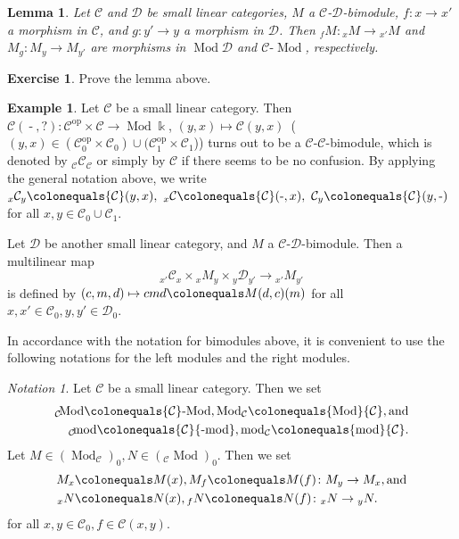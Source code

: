 \documentclass{surv-l}
\numberwithin{equation}{chapter}
\numberwithin{figure}{chapter}
\theoremstyle{plain}
\newtheorem{lem}[thm]{Lemma}
\theoremstyle{definition}
\newtheorem{exm}[thm]{Example}
\newtheorem{exc}[thm]{Exercise}
\theoremstyle{remark}
\newtheorem{ntn}[thm]{Notation}
\newcommand{\lMod}{\text{-}\!\Mod}
\newcommand{\lmod}{\text{-}\!\operatorname{mod}}
\newcommand{\llow}[1]{{}_{#1}\!}
\DeclareMathOperator{\Mod}{Mod}
\DeclareMathOperator{\blank}{-}
\begin{document}
\begin{lem}\label{lem:bimod-onesided}
Let ${\mathcal{C}}$ and ${\mathcal{D}}$ be small linear categories, $M$ a ${\mathcal{C}}$-${\mathcal{D}}$-bimodule,
$f \colon x \to x'$ a  morphism in ${\mathcal{C}}$, and $g \colon y' \to y$ a morphism
in ${\mathcal{D}}$.
Then ${}_fM \colon {}_xM \to {}_{x'}M$ and $M_g \colon M_y \to M_{y'}$
are morphisms in $\Mod{\mathcal{D}}$ and ${\mathcal{C}}\lMod$, respectively.
\end{lem}

\begin{exc}
Prove the lemma above.
\end{exc}

\begin{exm}
Let ${\mathcal{C}}$ be a small linear category.
Then ${\mathcal{C}}(\blank, ?) \colon {\mathcal{C}}^{\mathrm{op}} \times {\mathcal{C}} \to \Mod\Bbbk$,
$(y, x) \mapsto {\mathcal{C}}(y, x)$\ ($(y, x) \in ({\mathcal{C}}^{\mathrm{op}}_0 \times {\mathcal{C}}_0) \cup ({\mathcal{C}}^{\mathrm{op}}_1 \times {\mathcal{C}}_1$))
turns out to be a ${\mathcal{C}}$-${\mathcal{C}}$-bimodule,
which is denoted by ${}_{\mathcal{C}}{\mathcal{C}}_{\mathcal{C}}$ or simply by ${\mathcal{C}}$
if there seems to be no confusion.
By applying the general notation above,
we write
${}_x{\mathcal{C}}_y\colonequals  {\mathcal{C}}(y, x),\  {}_x{\mathcal{C}}\colonequals  {\mathcal{C}}(\text{-}, x),\  {\mathcal{C}}_y\colonequals  {\mathcal{C}}(y, \text{-})$
for all $x, y \in {\mathcal{C}}_0 \cup {\mathcal{C}}_1$.

Let ${\mathcal{D}}$ be another small linear category, and $M$ a ${\mathcal{C}}$-${\mathcal{D}}$-bimodule.
Then a multilinear map
\[
{}_{x'}{\mathcal{C}}_x \times {}_xM_y \times {}_y{\mathcal{D}}_{y'} \to {}_{x'}M_{y'}
\]
is defined by $(c, m, d) \mapsto cmd\colonequals  M(d, c)(m)$
for all $x,x' \in {\mathcal{C}}_0, y, y' \in {\mathcal{D}}_0$.
\end{exm}

In accordance with the notation for bimodules above,
it is convenient to use the following notations for the left modules and the right modules.

\begin{ntn}
Let ${\mathcal{C}}$ be a small linear category.
Then we set
\[
\begin{aligned}
\llow{\mathcal{C}} {\Mod}  \colonequals  {\mathcal{C}}\lMod , {\Mod}_{{\mathcal{C}}} \colonequals  {\Mod} {\mathcal{C}}, \text{and} \\
\llow{\mathcal{C}} { \operatorname{mod}}  \colonequals  {\mathcal{C}} { \lmod} , { \operatorname{mod}}_{{\mathcal{C}}} \colonequals  { \operatorname{mod}} {\mathcal{C}}.
\end{aligned}
\]
Let $M \in (\Mod_{\mathcal{C}})_0, N \in ({}_{\mathcal{C}}\!\Mod)_0$.
Then we set
\[
\begin{aligned}
M_x&\colonequals  M(x), M_f\colonequals  M(f) \colon M_y \to M_x, \text{and}\\
{}_xN&\colonequals  N(x), {}_fN\colonequals  N(f) \colon {}_xN \to {}_yN.
\end{aligned}
\]
for all $x, y \in {\mathcal{C}}_0, f \in {\mathcal{C}}(x, y)$.
\end{ntn}
\end{document}
